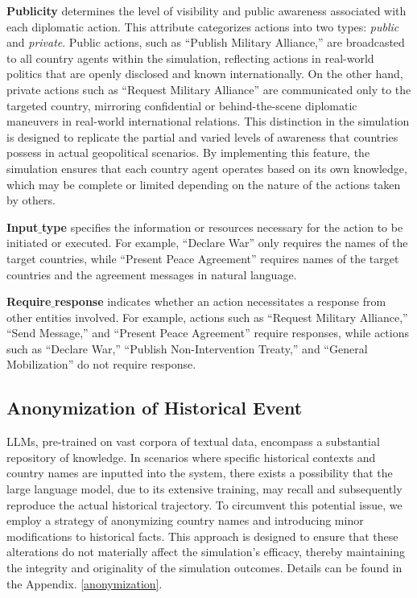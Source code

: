 \documentclass{article}
\begin{document}
\textbf{Publicity} determines the level of visibility and public awareness associated with each diplomatic action. This attribute categorizes actions into two types: \textit{public} and \textit{private}. Public actions, such as ``Publish Military Alliance,'' are broadcasted to all country agents within the simulation, reflecting actions in real-world politics that are openly disclosed and known internationally. On the other hand, private actions such as ``Request Military Alliance'' are communicated only to the targeted country, mirroring confidential or behind-the-scene diplomatic maneuvers in real-world international relations. This distinction in the simulation is designed to replicate the partial and varied levels of awareness that countries possess in actual geopolitical scenarios. By implementing this feature, the simulation ensures that each country agent operates based on its own knowledge, which may be complete or limited depending on the nature of the actions taken by others. 
    
\textbf{Input$\_$type} specifies the information or resources necessary for the action to be initiated or executed. For example, ``Declare War'' only requires the names of the target countries, while ``Present Peace Agreement'' requires names of the target countries and the agreement messages in natural language.

\textbf{Require$\_$response} indicates whether an action necessitates a response from other entities involved. For example, actions such as ``Request Military Alliance,'' ``Send Message,'' and ``Present Peace Agreement'' require responses, while actions such as ``Declare War,'' ``Publish Non-Intervention Treaty,'' and ``General Mobilization'' do not require response.

\subsection{Anonymization of Historical Event}
LLMs, pre-trained on vast corpora of textual data, encompass a substantial repository of knowledge. In scenarios where specific historical contexts and country names are inputted into the system, there exists a possibility that the large language model, due to its extensive training, may recall and subsequently reproduce the actual historical trajectory. To circumvent this potential issue, we employ a strategy of anonymizing country names and introducing minor modifications to historical facts. This approach is designed to ensure that these alterations do not materially affect the simulation's efficacy, thereby maintaining the integrity and originality of the simulation outcomes. Details can be found in the Appendix. \ref{anonymization}.
\end{document}
